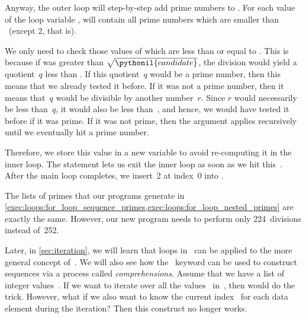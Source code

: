 Anyway, the outer loop will step-by-step add prime numbers to .
For each value of the loop variable ,  will contain all prime numbers which are smaller than ~(except 2, that is).

We only need to check those values of  which are less than or equal to .
This is because if  was greater than $\sqrt{\pythonil{candidate}}$, the division would yield a quotient~$q$ less than .
If this quotient~$q$ would be a prime number, then this means that we already tested it before.
If it was not a prime number, then it means that~$q$ would be divisible by another number~$r$.
Since $r$ would necessarily be less than~$q$, it would also be less than~, and hence, we would have tested it before if it was prime.
If it was not prime, then the argument applies recursively until we eventually hit a prime number.

Therefore, we store this value in a new variable  to avoid re-computing it in the inner loop.
The  statement lets us exit the inner loop as soon as we hit this~.
After the main loop completes, we insert~2 at index~0 into .

The lists of primes that our programs generate in \cref{exec:loops:for_loop_sequence_primes,exec:loops:for_loop_nested_primes} are exactly the same.
However, our new program needs to perform only 224~divisions instead of~252.

Later, in \cref{sec:iteration}, we will learn that loops in \python\ can be applied to the more general concept of~.
We will also see how the ~keyword can be used to construct sequences via a process called \emph{comprehensions}.%
%
\FloatBarrier%
\endhsection%
%
%
\label{sec:enumOverSequences}%
%
%
%
%
%
%
%
Assume that we have a list  of integer values~.
If we want to iterate over all the values~ in~, then  would do the trick.
However, what if we also want to know the current index~ for each data element during the iteration?
Then this construct no longer works.


